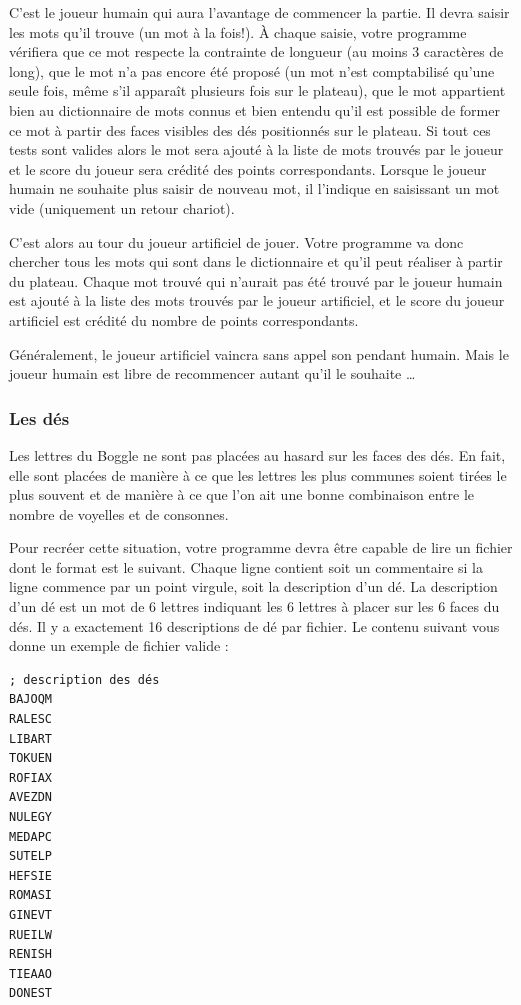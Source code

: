 \documentclass[10pt]{article}
\begin{document}
C'est le joueur humain qui aura l'avantage de commencer la partie. Il devra
saisir les mots qu'il trouve (un mot à la fois!). \`A chaque saisie, votre
programme vérifiera que ce mot respecte la contrainte de longueur (au moins 3
caractères de long), que le mot n'a pas encore été proposé (un mot n'est
comptabilisé qu'une seule fois, même s'il apparaît plusieurs fois sur le
plateau), que le mot appartient bien au dictionnaire de mots connus et bien
entendu qu'il est possible de former ce mot à partir des faces visibles des
dés positionnés sur le plateau. Si tout ces tests sont valides alors le mot
sera ajouté à la liste de mots trouvés par le joueur et le score du joueur sera
crédité des points correspondants. Lorsque le joueur humain ne souhaite plus
saisir de nouveau mot, il l'indique en saisissant un mot vide (uniquement un
retour chariot).

C'est alors au tour du joueur artificiel de jouer. Votre programme va donc
chercher tous les mots qui sont dans le dictionnaire et qu'il peut réaliser à
partir du plateau. Chaque mot trouvé qui n'aurait pas été trouvé par le joueur
humain est ajouté à la liste des mots trouvés par le joueur artificiel, et le
score du joueur artificiel est crédité du nombre de points correspondants.

Généralement, le joueur artificiel vaincra sans appel son pendant humain. Mais
le joueur humain est libre de recommencer autant qu'il le souhaite \ldots


\subsubsection*{Les dés}

Les lettres du Boggle ne sont pas placées au hasard sur les faces des dés. En
fait, elle sont placées de manière à ce que les lettres les plus communes
soient tirées le plus souvent et de manière à ce que l'on ait une bonne
combinaison entre le nombre de voyelles et de consonnes.

Pour recréer cette situation, votre programme devra être capable de lire un
fichier dont le format est le suivant. Chaque ligne contient soit un
commentaire si la ligne commence par un point virgule, soit la description
d'un dé. La description d'un dé est un mot de 6 lettres indiquant les 6
lettres à placer sur les 6 faces du dés. Il y a exactement 16 descriptions de
dé par fichier. Le contenu suivant vous donne un exemple de fichier valide :

\begin{Verbatim}[label=dices-definition.txt,numbers=none,fontsize=\small]
; description des dés
BAJOQM
RALESC
LIBART
TOKUEN
ROFIAX
AVEZDN
NULEGY
MEDAPC
SUTELP
HEFSIE
ROMASI
GINEVT
RUEILW
RENISH
TIEAAO
DONEST
\end{Verbatim}
\end{document}

